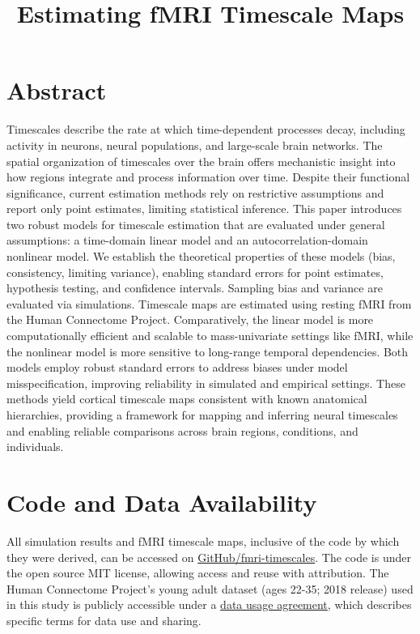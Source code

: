 \documentclass[9pt]{article}
\title{Estimating fMRI Timescale Maps}
\date{}
\begin{document}
\maketitle

\section*{Abstract}
Timescales describe the rate at which time-dependent processes decay, including activity in neurons, neural populations, and large-scale brain networks. The spatial organization of timescales over the brain offers mechanistic insight into how regions integrate and process information over time. Despite their functional significance, current estimation methods rely on restrictive assumptions and report only point estimates, limiting statistical inference. This paper introduces two robust models for timescale estimation that are evaluated under general assumptions: a time-domain linear model and an autocorrelation-domain nonlinear model. We establish the theoretical properties of these models (bias, consistency, limiting variance), enabling standard errors for point estimates, hypothesis testing, and confidence intervals. Sampling bias and variance are evaluated via simulations. Timescale maps are estimated using resting fMRI from the Human Connectome Project. Comparatively, the linear model is more computationally efficient and scalable to mass-univariate settings like fMRI, while the nonlinear model is more sensitive to long-range temporal dependencies. Both models employ robust standard errors to address biases under model misspecification, improving reliability in simulated and empirical settings. These methods yield cortical timescale maps consistent with known anatomical hierarchies, providing a framework for mapping and inferring neural timescales and enabling reliable comparisons across brain regions, conditions, and individuals.






\section{Code and Data Availability}
All simulation results and fMRI timescale maps, inclusive of the code by which they were derived, can be accessed on \href{https://github.com/griegner/fmri-timescales}{GitHub/fmri-timescales}. The code is under the open source MIT license, allowing access and reuse with attribution. The Human Connectome Project's young adult dataset (ages 22-35; 2018 release) used in this study is publicly accessible under a \href{https://www.humanconnectome.org/storage/app/media/data_use_terms/DataUseTerms-HCP-Open-Access-26Apr2013.pdf}{data usage agreement}, which describes specific terms for data use and sharing.


\end{document}

